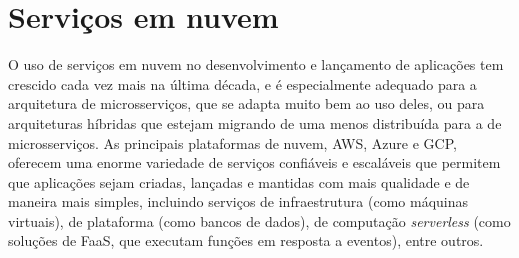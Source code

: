 

\section{Serviços em nuvem}


O uso de serviços em nuvem no desenvolvimento e lançamento de aplicações tem crescido cada vez mais na última década, e é especialmente adequado para a arquitetura de microsserviços, que se adapta muito bem ao uso deles, ou para arquiteturas híbridas que estejam migrando de uma menos distribuída para a de microsserviços. As principais plataformas de nuvem, AWS, Azure e GCP, oferecem uma enorme variedade de serviços confiáveis e escaláveis que permitem que aplicações sejam criadas, lançadas e mantidas com mais qualidade e de maneira mais simples, incluindo serviços de infraestrutura (como máquinas virtuais), de plataforma (como bancos de dados), de computação \emph{serverless} (como soluções de FaaS, que executam funções em resposta a eventos), entre outros. \cite{livro-building-microservices}

